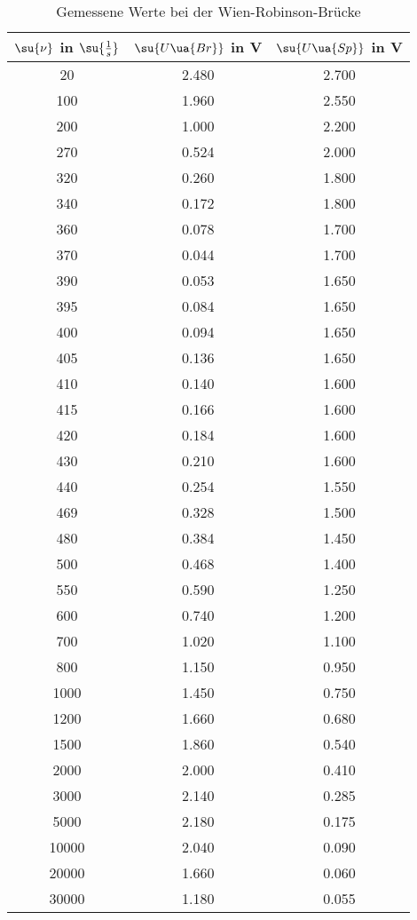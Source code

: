 \begin{table}
  \centering
  \label{tab:MessungE}
  \caption{Gemessene Werte bei der Wien-Robinson-Brücke}
  \begin{tabular}{ c c c}
    \toprule
    $\su{\nu}$ in $\su{\frac{1}{s}}$ & $\su{U\ua{Br}}$ in V & $\su{U\ua{Sp}}$ in V \\
    \midrule
    20   & 2.480  & 2.700 \\
    100  & 1.960  & 2.550 \\
    200  & 1.000  & 2.200 \\
    270  & 0.524  & 2.000 \\
    320  & 0.260  & 1.800 \\
    340  & 0.172  & 1.800 \\
    360  & 0.078  & 1.700 \\
    370  & 0.044  & 1.700 \\
    390   & 0.053 & 1.650 \\
    395   & 0.084 & 1.650 \\
    400   & 0.094 & 1.650 \\
    405   & 0.136 & 1.650 \\
    410   & 0.140 & 1.600 \\
    415   & 0.166 & 1.600 \\
    420   & 0.184 & 1.600 \\
    430   & 0.210 & 1.600 \\
    440   & 0.254 & 1.550 \\
    469   & 0.328 & 1.500 \\
    480   & 0.384 & 1.450 \\
    500   & 0.468 & 1.400 \\
    550   & 0.590 & 1.250 \\
    600   & 0.740 & 1.200 \\
    700   & 1.020 & 1.100 \\
    800   & 1.150 & 0.950 \\
    1000  & 1.450 & 0.750 \\
    1200  & 1.660 & 0.680 \\
    1500  & 1.860 & 0.540 \\
    2000  & 2.000 & 0.410 \\
    3000  & 2.140 & 0.285 \\
    5000  & 2.180 & 0.175 \\
    10000 & 2.040 & 0.090 \\
    20000 & 1.660 & 0.060 \\
    30000 & 1.180 & 0.055 \\
    \bottomrule
  \end{tabular}
\end{table}





